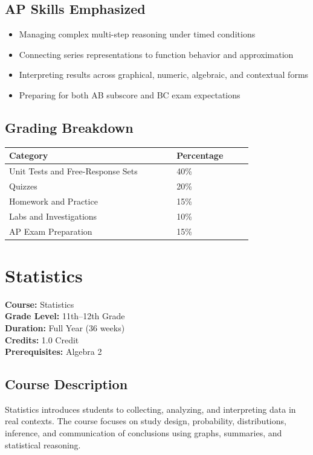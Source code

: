 \documentclass[12pt,oneside]{book}
\begin{document}
\section{AP Skills Emphasized}
\begin{itemize}[leftmargin=2em]
    \item Managing complex multi-step reasoning under timed conditions
    \item Connecting series representations to function behavior and approximation
    \item Interpreting results across graphical, numeric, algebraic, and contextual forms
    \item Preparing for both AB subscore and BC exam expectations
\end{itemize}

\section{Grading Breakdown}
\begin{center}
\begin{tabular}{L{0.55\linewidth}L{0.25\linewidth}}
\toprule
\textbf{Category} & \textbf{Percentage} \\
\midrule
Unit Tests and Free-Response Sets & 40\% \\
Quizzes & 20\% \\
Homework and Practice & 15\% \\
Labs and Investigations & 10\% \\
AP Exam Preparation & 15\% \\
\bottomrule
\end{tabular}
\end{center}

\chapter{Statistics}

\noindent\textbf{Course:} Statistics\\
\textbf{Grade Level:} 11th--12th Grade\\
\textbf{Duration:} Full Year (36 weeks)\\
\textbf{Credits:} 1.0 Credit\\
\textbf{Prerequisites:} Algebra 2

\section{Course Description}
Statistics introduces students to collecting, analyzing, and interpreting data in real contexts. The course
focuses on study design, probability, distributions, inference, and communication of conclusions using
graphs, summaries, and statistical reasoning.
\end{document}
